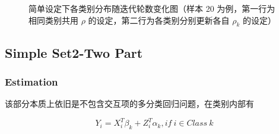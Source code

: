 \documentclass[12pt, a4paper, oneside]{article}
\numberwithin{equation}{section}
\begin{document}
\begin{figure}
{\begin{minipage}[t]{0.33\linewidth}
		\vspace{0.02cm}
	\end{minipage}%
	}%
	\centering
	\caption{简单设定下各类别分布随迭代轮数变化图（样本 20 为例，第一行为相同类别共用 $\rho$ 的设定，第二行为各类别分别更新各自 $\rho_k$ 的设定）}
	\vspace{-0.2cm}
	\label{fig:simple-vis}
\end{figure}




\subsection{Simple Set2-Two Part}

\subsubsection{Estimation}

该部分本质上依旧是不包含交互项的多分类回归问题，在类别内部有

\begin{equation}
	Y_i = X_i^T\beta_k + Z_i^T\alpha_k, if\ i\in Class\ k
\end{equation}
\end{document}
